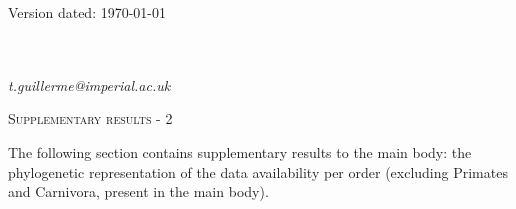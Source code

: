 \documentclass[12pt,letterpaper]{article}
\renewcommand{\section}[1]{%
\bigskip
\begin{center}
\begin{Large}
\normalfont\scshape #1
\medskip
\end{Large}
\end{center}}
\begin{document}
\newcommand{\beginsupplement}{%
    \setcounter{table}{0}
    \renewcommand{\thetable}{S\arabic{table}}%
    \setcounter{figure}{0}
    \renewcommand{\thefigure}{S\arabic{figure}}%
}

\begin{flushright}
Version dated: \today
\end{flushright}

\bigskip
\medskip
\begin{center}


\bigskip
{}

\bigskip
{}\\
\\
\medskip
{} \textit{t.guillerme@imperial.ac.uk}\\  
\vspace{1in}

\end{center}


\newpage





\section{Supplementary results - 2}
The following section contains supplementary results to the main body: the phylogenetic representation of the data availability per order (excluding Primates and Carnivora, present in the main body).
\end{document}
